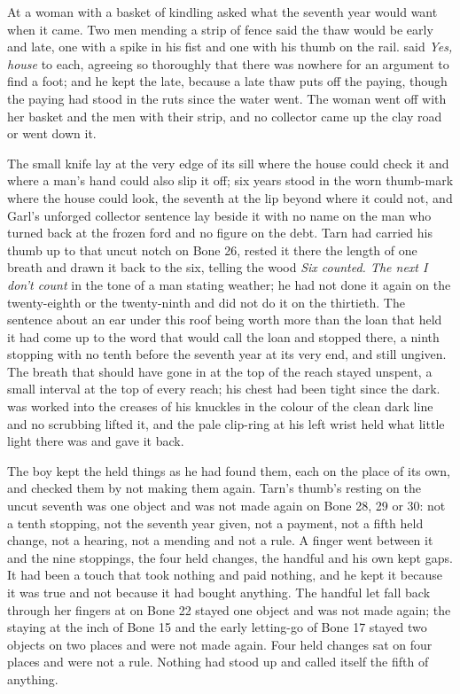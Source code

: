 At  a woman with a basket of kindling asked what the seventh year would want when it came. Two men mending a strip of fence said the thaw would be early and late, one with a spike in his fist and one with his thumb on the rail.  said \emph{Yes, house} to each, agreeing so thoroughly that there was nowhere for an argument to find a foot; and he kept the late, because a late thaw puts off the paying, though the paying had stood in the ruts since the water went. The woman went off with her basket and the men with their strip, and no collector came up the clay road or went down it.

The small knife lay at the very edge of its sill where the house could check it and where a man's hand could also slip it off; six years stood in the worn thumb-mark where the house could look, the seventh at the lip beyond where it could not, and Garl's unforged collector sentence lay beside it with no name on the man who turned back at the frozen ford and no figure on the debt. Tarn had carried his thumb up to that uncut notch on Bone 26, rested it there the length of one breath and drawn it back to the six, telling the wood \emph{Six counted. The next I don't count} in the tone of a man stating weather; he had not done it again on the twenty-eighth or the twenty-ninth and did not do it on the thirtieth. The sentence about an ear under this roof being worth more than the loan that held it had come up to the word that would call the loan and stopped there, a ninth stopping with no tenth before the seventh year at its very end, and still ungiven. The breath that should have gone in at the top of the reach stayed unspent, a small interval at the top of every reach; his chest had been tight since the dark.  was worked into the creases of his knuckles in the colour of the clean dark line and no scrubbing lifted it, and the pale clip-ring at his left wrist held what little light there was and gave it back.

\scenebreak

The boy kept the held things as he had found them, each on the place of its own, and checked them by not making them again. Tarn's thumb's resting on the uncut seventh was one object and was not made again on Bone 28, 29 or 30: not a tenth stopping, not the seventh year given, not a payment, not a fifth held change, not a hearing, not a mending and not a rule. A finger went between it and the nine stoppings, the four held changes, the handful and his own kept gaps. It had been a touch that took nothing and paid nothing, and he kept it because it was true and not because it had bought anything. The handful let fall back through her fingers at  on Bone 22 stayed one object and was not made again; the staying at the inch of Bone 15 and the early letting-go of Bone 17 stayed two objects on two places and were not made again. Four held changes sat on four places and were not a rule. Nothing had stood up and called itself the fifth of anything.

